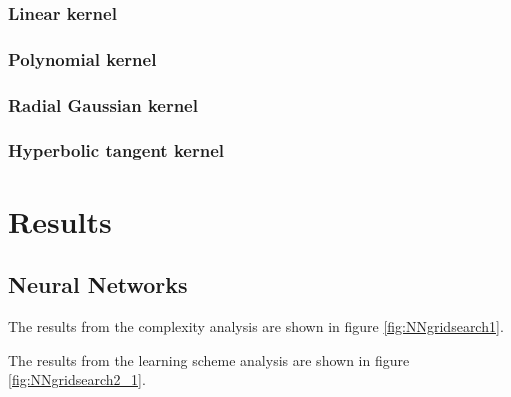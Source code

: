 \documentclass[nofootinbib,reprint,english]{revtex4-1}
\begin{document}
\subsubsection{Linear kernel}
\subsubsection{Polynomial kernel}
\subsubsection{Radial Gaussian kernel}
\subsubsection{Hyperbolic tangent kernel}



\section{Results}
\subsection{Neural Networks}
The results from the complexity analysis are shown in figure \ref{fig:NNgridsearch1}.

The results from the learning scheme analysis are shown in figure \ref{fig:NNgridsearch2_1}.

\onecolumngrid
\clearpage
\end{document}
